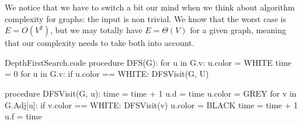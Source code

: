 \documentclass[a4paper]{article}
\begin{document}
{{        We notice that we have to switch a bit our mind when we think about algorithm complexity for graphs: the input is non trivial. We know that the worst case is $E = O\left(V^2\right)$, but we may totally have $E = \Theta\left(V\right)$ for a given graph, meaning that our complexity needs to take both into account.
    }


}

\begin{filecontents*}[overwrite]{DepthFirstSearch.code}
procedure DFS(G):
    for u in G.v:
        u.color = WHITE
    time = 0
    for u in G.v:
        if u.color == WHITE:
            DFSVisit(G, U)

procedure DFSVisit(G, u):
    time = time + 1
    u.d = time
    u.color = GREY
    for v in G.Adj[u]:
        if v.color == WHITE:
            DFSVisit(v)
    u.color = BLACK
    time = time + 1
    u.f = time
\end{filecontents*}
\end{document}
